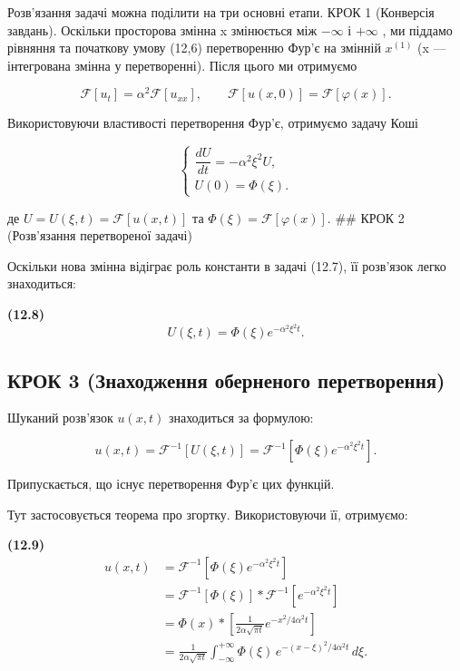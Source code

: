 \documentclass[
  ukrainian,
]{article}
\begin{document}
Розв'язання задачі можна поділити на три основні етапи. КРОК 1
(Конверсія завдань). Оскільки просторова змінна x змінюється між
\(-\infty\) і \(+\infty\) , ми піддамо рівняння та початкову умову
(12,6) перетворенню Фур'є на змінній \(x^{(1)}\) (x --- інтегрована
змінна у перетворенні). Після цього ми отримуємо

\[
\mathcal{F}[u_t] = \alpha^2 \mathcal{F}[u_{xx}],\qquad
\mathcal{F}[u(x,0)] = \mathcal{F}[\varphi(x)].
\]

Використовуючи властивості перетворення Фур'є, отримуємо задачу Коші

\[
\begin{cases}
\dfrac{dU}{dt}=-\alpha^2\xi^2U,\\
U(0)=\Phi(\xi).
\end{cases}
\]

де \(U=U(\xi,t)=\mathcal{F}[u(x,t)]\) та
\(\Phi(\xi)=\mathcal{F}[\varphi(x)]\). \#\# КРОК 2 (Розв'язання
перетвореної задачі)

Оскільки нова змінна відіграє роль константи в задачі (12.7), її
розв'язок легко знаходиться:

\textbf{(12.8)} \[
U(\xi,t)=\Phi(\xi)e^{-\alpha^2\xi^2 t}.
\]

\subsection{КРОК 3 (Знаходження оберненого
перетворення)}\label{ux43aux440ux43eux43a-3-ux437ux43dux430ux445ux43eux434ux436ux435ux43dux43dux44f-ux43eux431ux435ux440ux43dux435ux43dux43eux433ux43e-ux43fux435ux440ux435ux442ux432ux43eux440ux435ux43dux43dux44f}

Шуканий розв'язок \(u(x,t)\) знаходиться за формулою:

\[
u(x, t) = \mathcal{F}^{-1}\!\left[U(\xi, t)\right]
= \mathcal{F}^{-1}\!\left[\Phi(\xi)e^{-\alpha^2 \xi^2 t}\right].
\]

Припускається, що існує перетворення Фур'є цих функцій.

Тут застосовується теорема про згортку. Використовуючи її, отримуємо:

\textbf{(12.9)} \[
\begin{aligned}
u(x, t)
&= \mathcal{F}^{-1}\!\left[\Phi(\xi)e^{-\alpha^{2}\xi^{2} t}\right] \\
&= \mathcal{F}^{-1}\!\left[\Phi(\xi)\right] * \mathcal{F}^{-1}\!\left[e^{-\alpha^{2}\xi^{2} t}\right] \\
&= \Phi(x) * \left[\frac{1}{2\alpha \sqrt{\pi t}} e^{-x^{2}/4\alpha^{2} t}\right] \\
&= \frac{1}{2\alpha \sqrt{\pi t}} \int_{-\infty}^{+\infty} \Phi(\xi)\,e^{-(x-\xi)^{2}/4\alpha^{2} t}\,d\xi.
\end{aligned}
\]
\end{document}
